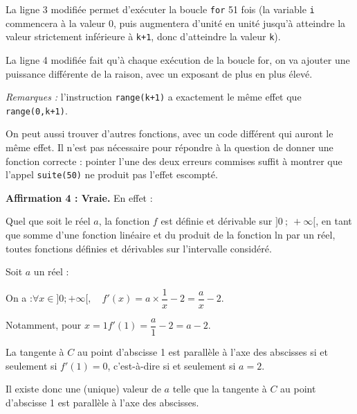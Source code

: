 \documentclass[10pt]{article}
\begin{document}
La ligne 3 modifiée permet d'exécuter la boucle \texttt{for} 51 fois (la variable \texttt{i} commencera à la valeur 0, puis augmentera d'unité en unité jusqu'à atteindre la valeur strictement inférieure à \texttt{k+1}, donc d'atteindre la valeur \texttt{k}).

La ligne 4 modifiée fait qu'à chaque exécution de la boucle for, on va ajouter une puissance différente de la raison, avec un exposant de plus en plus élevé.

\emph{Remarques :} l'instruction \texttt{range(k+1)} a exactement le même effet que \texttt{range(0,k+1)}.

On peut aussi trouver d'autres fonctions, avec un code différent qui auront le même effet. Il n'est pas nécessaire pour répondre à la question de donner une fonction correcte : pointer l'une des deux erreurs commises suffit à montrer que l'appel \texttt{suite(50)} ne produit pas l'effet escompté.

\medskip

\textbf{Affirmation 4 : Vraie.} \quad En effet :

Quel que soit le réel $a$, la fonction $f$ est définie et dérivable sur $]0~;~+\infty[ $, en tant que somme d'une fonction linéaire et du produit de la fonction ln par un réel, toutes fonctions définies et dérivables sur l'intervalle considéré.

Soit $a$ un réel :

On a :\quad $\forall x \in ]0 ; +\infty[, \quad f'(x) = a\times \dfrac{1}{x} - 2 = \dfrac{a}{x} - 2$.

Notamment, pour $x = 1 $\quad $f'(1) = \dfrac{a}{1} - 2 = a-2$.

La tangente à $C$ au point d'abscisse 1 est parallèle à l'axe des abscisses si et seulement si $f'(1) = 0$, c'est-à-dire si et seulement si $a = 2$.

Il existe donc une (unique) valeur de $a$ telle que la tangente à $C$ au point d'abscisse 1 est parallèle à l'axe des abscisses.
\end{document}
